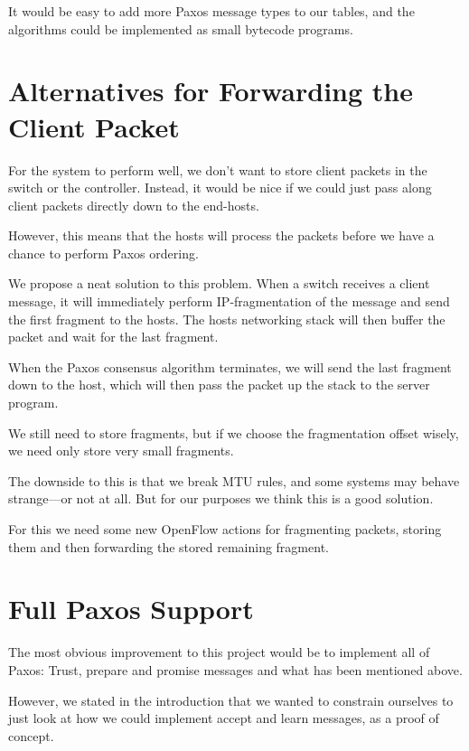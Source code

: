 It would be easy to add more Paxos message types to our tables, and the
algorithms could be implemented as small bytecode programs.

\section{Alternatives for Forwarding the Client Packet}
\label{chapter:improvement.client.packet}

For the system to perform well, we don't want to store client packets in the
switch or the controller.  Instead, it would be nice if we could just pass
along client packets directly down to the end-hosts.

However, this means that the hosts will process the packets before we have a
chance to perform Paxos ordering.

We propose a neat solution to this problem.  When a switch receives a client
message, it will immediately perform IP-fragmentation of the message and
send the first fragment to the hosts.  The hosts networking stack will then
buffer the packet and wait for the last fragment.

When the Paxos consensus algorithm terminates, we will send the last
fragment down to the host, which will then pass the packet up the stack to
the server program.

We still need to store fragments, but if we choose the fragmentation offset
wisely, we need only store very small fragments.

The downside to this is that we break MTU rules, and some systems may behave
strange---or not at all.  But for our purposes we think this is a good
solution.

For this we need some new OpenFlow actions for fragmenting packets, storing
them and then forwarding the stored remaining fragment.

\section{Full Paxos Support}

The most obvious improvement to this project would be to implement all of
Paxos: Trust, prepare and
promise messages and what has been mentioned above.

However, we stated in the introduction that we wanted to constrain ourselves
to just look at how we could implement accept and learn messages, as a
proof of concept.

